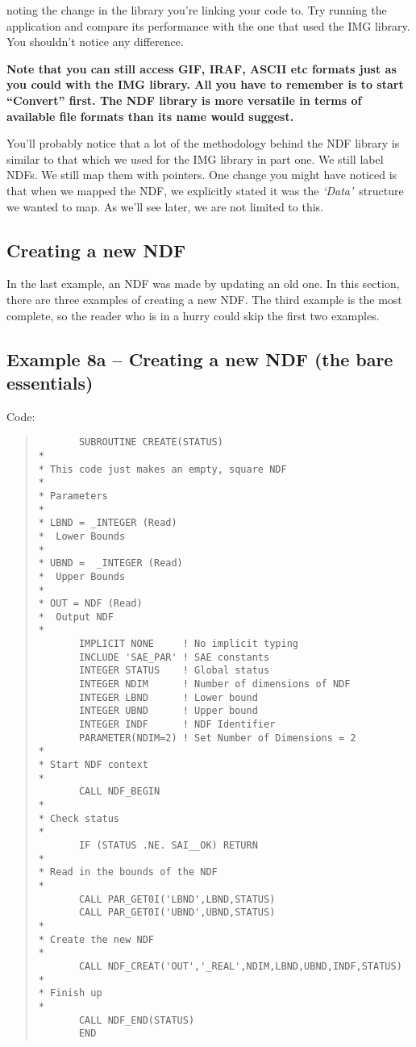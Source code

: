 noting the change in the library you're linking your code to. Try running
the application and compare its performance with the one that used the IMG 
library. You shouldn't notice any difference. 

{\bf Note that you can still access GIF, IRAF, ASCII etc formats just as
you could with the IMG library. All you have to remember is to start
``Convert'' first. The NDF library is more versatile in terms of available
file formats than its name would suggest.}

You'll probably notice that a lot of the methodology behind the
NDF library is similar to that which we used for the IMG library in part one.
We still label NDFs. We still map them with pointers. One change you 
might have noticed is that when we mapped the NDF, we explicitly stated
it was the {\em `Data'}\, structure we wanted to map. As we'll see
later, we are not limited to this.

\subsection{Creating a new NDF}

In the last example, an NDF was made by updating an old one. In this
section, there are three examples of creating a new NDF. The third
example is the most complete, so the reader who is in a hurry could
skip the first two examples.

\subsection{Example 8a -- Creating a new NDF (the bare essentials)}

Code:

\begin{quote}
{\small
\begin{verbatim}
       SUBROUTINE CREATE(STATUS)
*
* This code just makes an empty, square NDF 
*
* Parameters
* 
* LBND = _INTEGER (Read)
*  Lower Bounds
*
* UBND =  _INTEGER (Read)
*  Upper Bounds
*
* OUT = NDF (Read)
*  Output NDF
*
       IMPLICIT NONE     ! No implicit typing
       INCLUDE 'SAE_PAR' ! SAE constants
       INTEGER STATUS    ! Global status
       INTEGER NDIM      ! Number of dimensions of NDF
       INTEGER LBND      ! Lower bound
       INTEGER UBND      ! Upper bound
       INTEGER INDF      ! NDF Identifier
       PARAMETER(NDIM=2) ! Set Number of Dimensions = 2
*
* Start NDF context
*
       CALL NDF_BEGIN
*
* Check status
*
       IF (STATUS .NE. SAI__OK) RETURN
*
* Read in the bounds of the NDF
* 
       CALL PAR_GET0I('LBND',LBND,STATUS)       
       CALL PAR_GET0I('UBND',UBND,STATUS)       
*
* Create the new NDF
*
       CALL NDF_CREAT('OUT','_REAL',NDIM,LBND,UBND,INDF,STATUS)
*
* Finish up
*
       CALL NDF_END(STATUS)
       END
\end{verbatim}
}
\end{quote}

